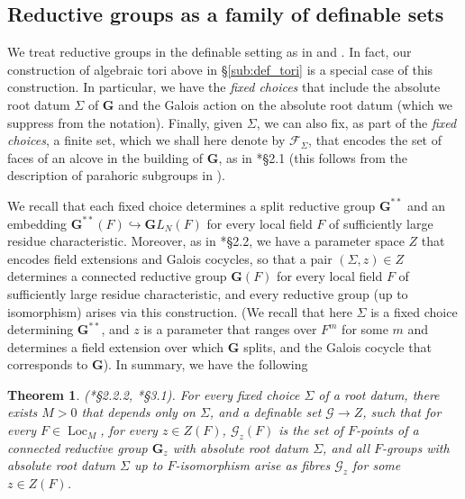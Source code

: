 \documentclass{amsart}
\newcommand{\cF}{\mathcal{F}}
\newcommand{\loc}{\operatorname{Loc}}
\newcommand{\bG}{\mathbf{G}}
\newcommand{\cG}{\mathcal{G}}
\theoremstyle{plain}
\newtheorem{theorem}[thm]{Theorem}
\theoremstyle{definition}
\begin{document}
\subsection{Reductive groups as a family of definable sets}
We treat reductive groups in the definable setting as in \cite{hales:transfert} and \cite{CGH-2}.
In fact, our construction of algebraic tori above in \S \ref{sub:def_tori} is a special case of this construction. 
In particular, we have the \emph{fixed choices} that include the absolute root datum $\Sigma$ of $\bG$ %
and  the Galois action on the absolute root datum  (which we suppress from the notation). Finally, given $\Sigma$, we can also fix, as part of the \emph{fixed choices},  a finite set, which we shall here denote by 
$\cF_\Sigma$, that encodes the set of faces of an alcove in the building of $\bG$, as in \cite{hales:transfert}*{\S 2.1} (this follows from the description of parahoric subgroups in  \cite{gross:parahorics}).  

We recall that each  fixed choice determines  a split reductive group $\bG^{\ast\ast}$ and an embedding 
$\bG^{\ast\ast}(F)\hookrightarrow {\mathbf GL}_N(F)$ for every local field $F$ of sufficiently large residue characteristic.  
Moreover, as in \cite{hales:transfert}*{\S 2.2}, we  have a parameter space $Z$ that encodes field extensions and Galois cocycles, so that a pair 
$(\Sigma, z)\in Z$ determines a connected reductive group $\bG(F)$ for every local field $F$ of sufficiently large residue characteristic, and every reductive group (up to isomorphism)  arises via this construction. 
(We recall that here $\Sigma$ is a fixed choice determining $\bG^{\ast\ast}$, and $z$ is a parameter that ranges over $F^m$ for some $m$ and determines a field extension over which $\bG$ splits, and the Galois cocycle that corresponds to $\bG$). 
In summary, we have the following 
\begin{theorem}\label{thm:def_groups}(\cite{hales:transfert}*{\S 2.2.2}, \cite{CGH-2}*{\S 3.1}). 
 For every fixed choice $\Sigma$ of a root datum, there exists $M>0$ that depends only on 
$\Sigma$, and a  definable set $\cG \to Z$, such that 
for every $F\in \loc_M$, for every $z\in Z(F)$, ${\cG_z}(F)$ is the set of $F$-points of a connected reductive group $\bG_z$ with absolute root datum $\Sigma$, and all $F$-groups with absolute root datum 
$\Sigma$ up to $F$-isomorphism arise as fibres $\cG_z$ for some $z\in Z(F)$.  
\end{theorem}
\end{document}
